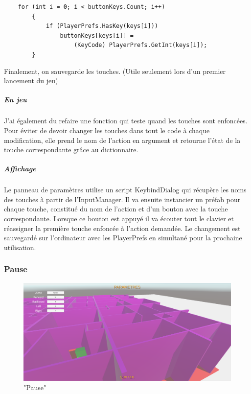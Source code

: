 \documentclass{article}
\begin{document}
\par\vspace{0.2cm}
\begin{lstlisting}
    for (int i = 0; i < buttonKeys.Count; i++)
        {
            if (PlayerPrefs.HasKey(keys[i]))
                buttonKeys[keys[i]] = 
                    (KeyCode) PlayerPrefs.GetInt(keys[i]);
        }
\end{lstlisting}

Finalement, on sauvegarde les touches. (Utile seulement lors d'un premier lancement du jeu)

\subparagraph{En jeu}
J'ai également du refaire une fonction qui teste quand les touches sont enfoncées. Pour éviter de devoir changer les touches dans tout le code à chaque modification, elle prend le nom de l'action en argument et retourne l'état de la touche correspondante grâce au dictionnaire.

\subparagraph{Affichage}
Le panneau de paramètres utilise un script KeybindDialog qui récupère les noms des touches à partir de l'InputManager. Il va ensuite instancier un préfab pour chaque touche, constitué du nom de l'action et d'un bouton avec la touche correspondante. Lorsque ce bouton est appuyé il va écouter tout le clavier et réassigner la première touche enfoncée à l'action demandée. Le changement est sauvegardé sur l'ordinateur avec les PlayerPrefs en simultané pour la prochaine utilisation.

\subsubsection{Pause}

\par\vspace{0.5cm}
\begin{figure}[!h]
    \centering
    \includegraphics[width=1\textwidth]{Pause.PNG}
    \caption{"Pause"}
    \label{Pause}
\end{figure}{}
\end{document}
